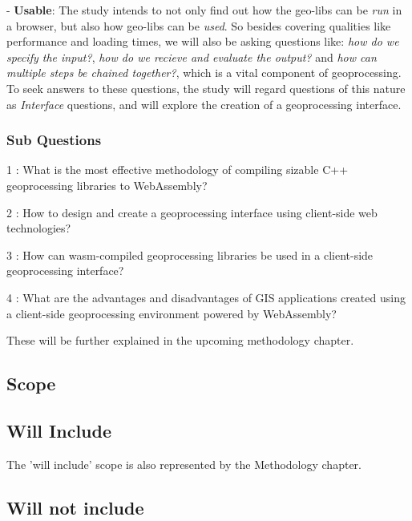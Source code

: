 - \textbf{Usable}: The study intends to not only find out how the geo-libs can be \textit{run} in a browser, but also how geo-libs can be \textit{used}. So besides covering qualities like performance and loading times, we will also be asking questions like: \textit{how do we specify the input?}, \textit{how do we recieve and evaluate the output?} and \textit{how can multiple steps be chained together?}, which is a vital component of geoprocessing. To seek answers to these questions, the study will regard questions of this nature as \textit{Interface} questions, and will explore the creation of a geoprocessing interface. 





\subsubsection*{Sub Questions}

1 : What is the most effective methodology of compiling sizable C++ geoprocessing libraries to WebAssembly?

2 : How to design and create a geoprocessing interface using client-side web technologies?

3 : How can wasm-compiled geoprocessing libraries be used in a client-side geoprocessing interface?

4 : What are the advantages and disadvantages of GIS applications created using a client-side geoprocessing environment powered by WebAssembly?

These will be further explained in the upcoming methodology chapter.

\newpage
\subsection{Scope}


\subsection*{Will Include}

The 'will include' scope is also represented by the Methodology chapter. 

\subsection*{Will not include}

